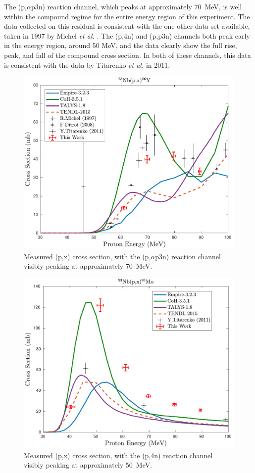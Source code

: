 The (p,$\alpha$p3n) reaction channel, which peaks at approximately \mbox{70 MeV}, is well within the compound regime for the entire energy region of this experiment.
The data collected on this residual is consistent with the one other data set available, taken in 1997 by Michel \emph{et al.} \cite{MICHEL1997153}. 
The (p,4n) and (p,p3n) channels both peak early in the energy region, around 50 MeV, and the data clearly show the full rise, peak, and fall of the compound cross section. 
In both of these channels, this data  is consistent with the data by Titarenko \emph{et al.} in 2011\cite{Titarenko2011}.

\begin{figure}
 \centering
 \includegraphics[width=0.5\linewidth]{./figures/86Y.pdf}
 \caption{Measured (p,x) cross section, with the (p,$\alpha$p3n) reaction channel visibly peaking at approximately \mbox{70 MeV}.}
 \label{fig:86Y}
\end{figure}




\begin{figure}
 \centering
 \includegraphics[width=0.5\linewidth]{./figures/90Mo.pdf}
 \caption{Measured (p,x) cross section, with the (p,4n) reaction channel visibly peaking at approximately \mbox{50 MeV}.}
 \label{fig:90Mo}
\end{figure}


